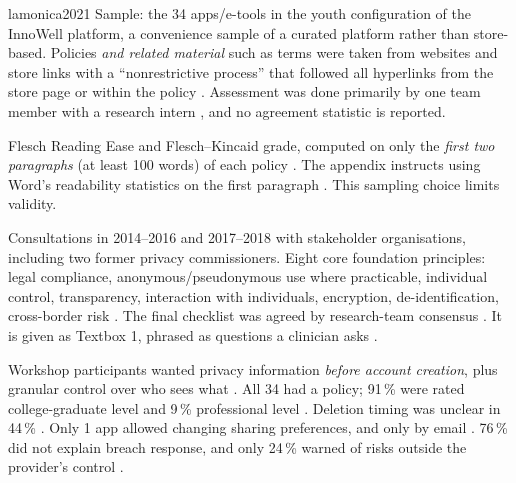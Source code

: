 \begin{papercard}{lamonica2021}
 Sample: the 34 apps/e-tools in the youth configuration of the InnoWell platform, a convenience sample of a curated platform rather than store-based. Policies \emph{and related material} such as terms were taken from websites and store links with a ``nonrestrictive process'' that followed all hyperlinks from the store page or within the policy . Assessment was done primarily by one team member with a research intern , and no agreement statistic is reported.

 Flesch Reading Ease and Flesch--Kincaid grade, computed on only the \emph{first two paragraphs} (at least 100 words) of each policy . The appendix instructs using Word's readability statistics on the first paragraph . This sampling choice limits validity.

 Consultations in 2014--2016 and 2017--2018 with stakeholder organisations, including two former privacy commissioners. Eight core foundation principles: legal compliance, anonymous/pseudonymous use where practicable, individual control, transparency, interaction with individuals, encryption, de-identification, cross-border risk . The final checklist was agreed by research-team consensus . It is given as Textbox 1, phrased as questions a clinician asks .

 Workshop participants wanted privacy information \emph{before account creation}, plus granular control over who sees what . All 34 had a policy; 91\,\% were rated college-graduate level and 9\,\% professional level . Deletion timing was unclear in 44\,\% . Only 1 app allowed changing sharing preferences, and only by email . 76\,\% did not explain breach response, and only 24\,\% warned of risks outside the provider's control .


\end{papercard}
